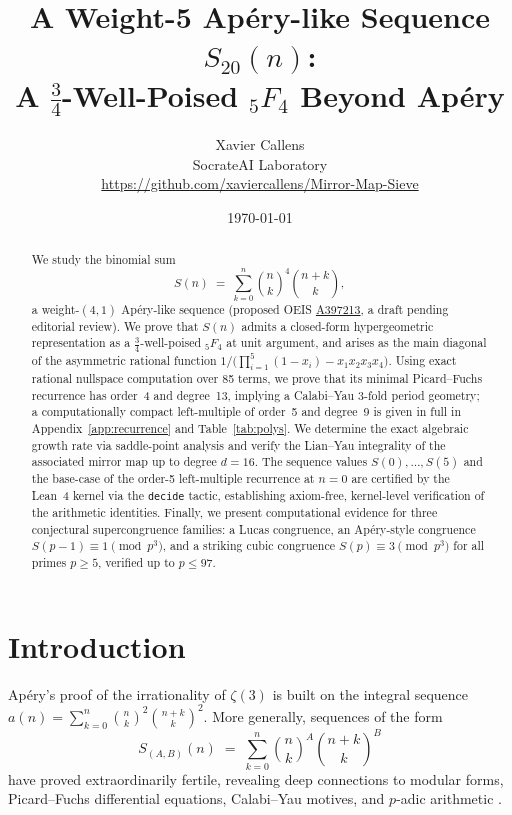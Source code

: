 \documentclass[11pt, a4paper]{article}
\title{A Weight-5 Apéry-like Sequence $S_{20}(n)$:\\
       A $\frac{3}{4}$-Well-Poised ${}_5F_4$ Beyond Ap\'ery}
\author{Xavier Callens \\
  SocrateAI Laboratory \\
  \url{https://github.com/xaviercallens/Mirror-Map-Sieve}}
\date{\today}
\begin{document}
\maketitle

\begin{abstract}
We study the binomial sum
\[
  S(n) \;=\; \sum_{k=0}^n \binom{n}{k}^4 \binom{n+k}{k},
\]
a weight-$(4,1)$ Ap\'ery-like sequence (proposed OEIS \href{https://oeis.org/draft/A397213}{A397213}, a draft pending editorial review).  We prove that $S(n)$ admits a
closed-form hypergeometric representation as a $\tfrac{3}{4}$-well-poised
${}_5F_4$ at unit argument, and arises as the
main diagonal of the asymmetric rational function
$1/\bigl(\prod_{i=1}^5(1-x_i) - x_1 x_2 x_3 x_4\bigr)$.
Using exact rational nullspace computation over 85 terms, we prove that its
minimal Picard--Fuchs recurrence has order~4 and degree~13, implying a
Calabi--Yau 3-fold period geometry; a computationally compact left-multiple
of order~5 and degree~9 is given in full in Appendix~\ref{app:recurrence} and
Table~\ref{tab:polys}.  We determine the exact algebraic growth rate via
saddle-point analysis and verify the Lian--Yau integrality of the associated
mirror map up to degree $d=16$.  The sequence values $S(0),\dots,S(5)$ and
the base-case of the order-5 left-multiple recurrence at $n=0$
are certified by the Lean~4 kernel via the \texttt{decide} tactic, establishing
axiom-free, kernel-level verification of the arithmetic identities.
Finally, we present computational evidence for three conjectural supercongruence
families: a Lucas congruence, an Ap\'ery-style congruence $S(p-1)\equiv
1\pmod{p^3}$, and a striking cubic congruence $S(p)\equiv 3\pmod{p^3}$ for
all primes $p\ge 5$, verified up to $p\le 97$.
\end{abstract}

\section{Introduction}

Ap\'ery's proof of the irrationality of $\zeta(3)$ \cite{vanderPoorten1979}
is built on the integral sequence
$a(n)=\sum_{k=0}^n\binom{n}{k}^2\binom{n+k}{k}^2$.
More generally, sequences of the form
\begin{equation}\label{eq:Sab}
  S_{(A,B)}(n) \;=\; \sum_{k=0}^n \binom{n}{k}^A \binom{n+k}{k}^B
\end{equation}
have proved extraordinarily fertile, revealing deep connections to modular
forms, Picard--Fuchs differential equations, Calabi--Yau motives, and
$p$-adic arithmetic \cite{Almkvist2005,Zagier2009,Straub2014,Osburn2016}.
\end{document}
